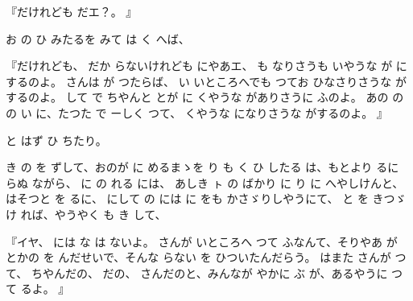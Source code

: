 
『だけれども
だエ？。
』

お
の
ひ
みたるを
みて
は
く
へば、

『だけれども、
だか
らないけれども
にやあエ、
も
なりさうも
いやうな
が
にするのよ。
さんは
が
つたらば、
い
いところへでも
つてお
ひなさりさうな
がするのよ。
して
で
ちやんと
とが
に
くやうな
がありさうに
ふのよ。
あの
の
の
い
に、たつた
で
ーしく
つて、
くやうな
になりさうな
がするのよ。
』

と
はず
ひ
ちたり。

き
の
を
ずして、おのが
に
めるまゝを
り
も
く
ひ
したる
は、もとより
るに
らぬ
ながら、
に
の
れる
には、
あしき
ㇳ
の
ばかり
に
り
に
へやしけんと、
はそつと
を
るに、
にして
の
には
に
をも
かさゞりしやうにて、
と
を
きつゞけ
れば、やうやく
も
き
して、

『イヤ、
には
な
は
ないよ。
さんが
いところへ
つて
ふなんて、そりやあ
が
とかの
を
んだせいで、そんな
らない
を
ひついたんだらう。
はまた
さんが
つて、
ちやんだの、
だの、
さんだのと、みんなが
やかに
ぶ
が、あるやうに
つて
るよ。
』

